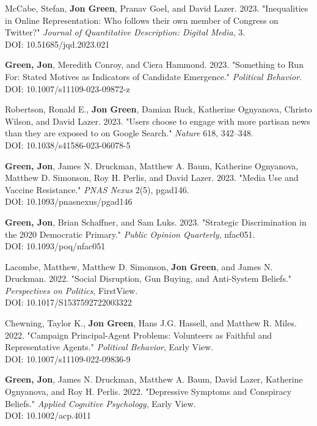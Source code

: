 \documentclass[letterpaper]{article}
\begin{document}
\begin{etaremune}
\item McCabe, Stefan, \textbf{Jon Green}, Pranav Goel, and David Lazer. 2023. "Inequalities in Online Representation: Who follows their own member of Congress on Twitter?" \textit{Journal of Quantitative Description: Digital Media}, 3.\\
DOI: 10.51685/jqd.2023.021

\item \textbf{Green, Jon}, Meredith Conroy, and Ciera Hammond. 2023. "Something to Run For: Stated Motives as Indicators of Candidate Emergence." \textit{Political Behavior}.\\
DOI: 10.1007/s11109-023-09872-z

\item Robertson, Ronald E., \textbf{Jon Green}, Damian Ruck, Katherine Ognyanova, Christo Wilson, and David Lazer. 2023. "Users choose to engage with more partisan news than they are exposed to on Google Search." \textit{Nature} 618, 342–348.\\
DOI: 10.1038/s41586-023-06078-5

\item \textbf{Green, Jon}, James N. Druckman, Matthew A. Baum, Katherine Ognyanova, Matthew D. Simonson, Roy H. Perlis, and David Lazer. 2023. "Media Use and Vaccine Resistance." \textit{PNAS Nexus} 2(5), pgad146.\\
DOI: 10.1093/pnasnexus/pgad146

\item \textbf{Green, Jon}, Brian Schaffner, and Sam Luks. 2023. "Strategic Discrimination in the 2020 Democratic Primary." \textit{Public Opinion Quarterly}, nfac051.\\
DOI: 10.1093/poq/nfac051

\item Lacombe, Matthew, Matthew D. Simonson, \textbf{Jon Green}, and James N. Druckman. 2022. "Social Disruption, Gun Buying, and Anti-System Beliefs." \textit{Perspectives on Politics}, FirstView. \\
DOI: 10.1017/S1537592722003322

\item Chewning, Taylor K., \textbf{Jon Green}, Hans J.G. Hassell, and Matthew R. Miles. 2022. "Campaign Principal-Agent Problems: Volunteers as Faithful and Representative Agents." \textit{Political Behavior}, Early View. \\
DOI: 10.1007/s11109-022-09836-9

\item \textbf{Green, Jon}, James N. Druckman, Matthew A. Baum, David Lazer, Katherine Ognyanova, and Roy H. Perlis. 2022. "Depressive Symptoms and Conspiracy Beliefs." \textit{Applied Cognitive Psychology}, Early View. \\
DOI: 10.1002/acp.4011


\end{etaremune}
\end{document}
